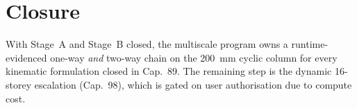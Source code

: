 \section{Closure}

With Stage~A and Stage~B closed, the multiscale program owns a
runtime-evidenced one-way \emph{and} two-way chain on the 200~mm
cyclic column for every kinematic formulation closed in Cap.~89. The
remaining step is the dynamic 16-storey escalation (Cap.~98), which is
gated on user authorisation due to compute cost.
